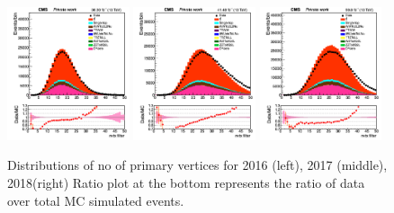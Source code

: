 \documentclass{cernatlasnote}
\newcommand{\pt}{$p_{\text T}$\xspace}
\begin{document}
\begin{figure}[h]
\centering
 \includegraphics[width=0.32\textwidth]{images/emu_channel/2016/16_Range_0pt7_1pt3/Vertices_filtercut__Linear.png}
\includegraphics[width=0.32\textwidth]{images/emu_channel/2017/17_Range_0pt7_1pt3/Vertices_filtercut__Linear.png}
 \includegraphics[width=0.32\textwidth]{images/emu_channel/2018/18_Range_0pt7_1pt3/Vertices_filtercut__Linear.png}
  \caption{Distributions of no of primary vertices for 2016 (left), 2017 (middle), 2018(right) Ratio plot at the bottom represents the ratio of data over total MC simulated events.}
 \label{fig:nvert_emu}
  \end{figure}
\end{document}
